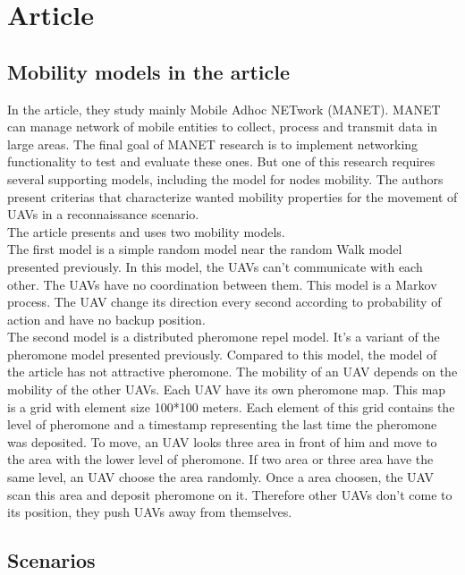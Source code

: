 \part{Article}

\setcounter{chapter}{0}

\chapter{Mobility models in the article}

In the article, they study mainly Mobile Adhoc NETwork (MANET). MANET can manage network of mobile entities to collect, process and transmit data in large areas. The final goal of MANET research is to implement networking functionality to test and evaluate these ones. But one of this research requires several supporting models, including the model for nodes mobility. The authors present criterias that characterize wanted mobility properties for the movement of UAVs in a reconnaissance scenario.\\

\noindent The article presents and uses two mobility models.\\

The first model is a simple random model near the random Walk model presented previously. In this model, the UAVs can't communicate with each other. The UAVs have no coordination between them. This model is a Markov process. The UAV change its direction every second according to probability of action and have no backup position.\\

The second model is a distributed pheromone repel model. It's a variant of the pheromone model presented previously. Compared to this model, the model of the article has not attractive pheromone. The mobility of an UAV depends on the mobility of the other UAVs. Each UAV have its own pheromone map. This map is a grid with element size 100*100 meters. Each element of this grid contains the level of pheromone and a timestamp representing the last time the pheromone was deposited. To move, an UAV looks three area in front of him and move to the area with the lower level of pheromone. If two area or three area have the same level, an UAV choose the area randomly. Once a area choosen, the UAV scan this area and deposit pheromone on it. Therefore other UAVs don't come to its position, they push UAVs away from themselves.

\chapter{Scenarios}

